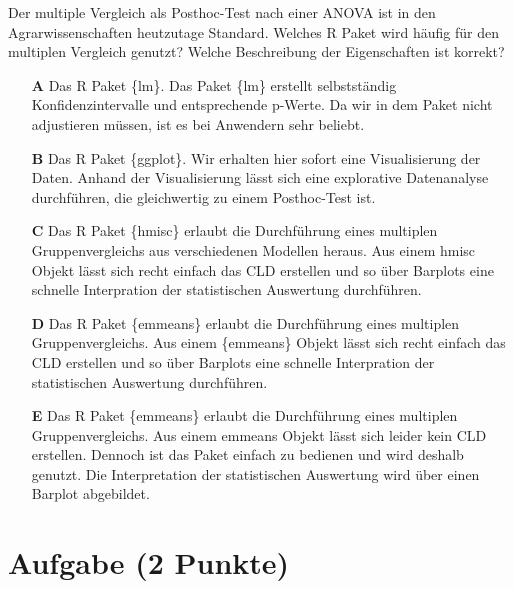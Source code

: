 \documentclass[a4paper, 9pt]{scrartcl}\usepackage[]{graphicx}\usepackage[]{xcolor}
\begin{document}
Der multiple Vergleich als Posthoc-Test nach einer ANOVA ist in den Agrarwissenschaften heutzutage Standard. Welches R Paket wird häufig für den multiplen Vergleich genutzt? Welche Beschreibung der Eigenschaften ist korrekt?



\begin{enumerate}
\item [\textbf{A} \msquare] Das R Paket \{lm\}. Das Paket \{lm\} erstellt selbstständig Konfidenzintervalle und entsprechende p-Werte. Da wir in dem Paket nicht adjustieren müssen, ist es bei Anwendern sehr beliebt.
\item [\textbf{B} \msquare] Das R Paket \{ggplot\}. Wir erhalten hier sofort eine Visualisierung der Daten. Anhand der Visualisierung lässt sich eine explorative Datenanalyse durchführen, die gleichwertig zu einem Posthoc-Test ist.
\item [\textbf{C} \msquare] Das R Paket \{hmisc\} erlaubt die Durchführung eines multiplen Gruppenvergleichs aus verschiedenen Modellen heraus. Aus einem hmisc Objekt lässt sich recht einfach das CLD erstellen und so über Barplots eine schnelle Interpration der statistischen Auswertung durchführen.
\item [\textbf{D} \msquare] Das R Paket \{emmeans\} erlaubt die Durchführung eines multiplen Gruppenvergleichs. Aus einem \{emmeans\} Objekt lässt sich recht einfach das CLD erstellen und so über Barplots eine schnelle Interpration der statistischen Auswertung durchführen.
\item [\textbf{E} \msquare] Das R Paket \{emmeans\} erlaubt die Durchführung eines multiplen Gruppenvergleichs. Aus einem emmeans Objekt lässt sich leider kein CLD erstellen. Dennoch ist das Paket einfach zu bedienen und wird deshalb genutzt. Die Interpretation der statistischen Auswertung wird über einen Barplot abgebildet.
\end{enumerate} 

\section{Aufgabe \hfill (2 Punkte)}

\ifcollection
\begin{flushright}
\tiny\vspace{-2Ex}
\textbf{\examinhaltstart}
\exammodulebiostat
\vspace{-1Ex}
\end{flushright}
\fi
\end{document}
